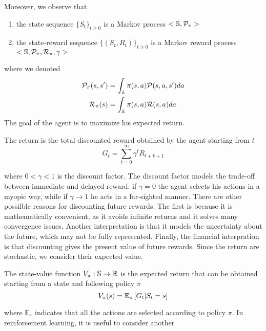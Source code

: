 Moreover, we observe that
\begin{enumerate}[label={\roman*)}]
	\item the state sequence ${\{S_t\}}_{t\geq 0}$ is a Markov process $<\S,
		  \calP_\pi>$
	  \item the state-reward sequence ${\{(S_t, R_t)\}}_{t\geq 0}$ is a Markov 
		  reward process $<\S, \calP_\pi, \calR_\pi, \gamma>$
\end{enumerate}
where we denoted 
\begin{equation}
	\begin{split}
		\calP_\pi(s, s') &= \int_\A \pi(s, a) \calP(s, a, s') da\\
		\calR_\pi(s) &= \int_\A \pi(s, a) \calR(s, a) da\\
	\end{split}
\end{equation}
The goal of the agent is to maximize his expected return. 
\begin{definition}[Return]
	The return is the total discounted reward obtained by the agent starting 
	from $t$  
	\begin{equation}
		G_t = \sum^{\infty}_{t=0} \gamma^t R_{t+k+1} 
	\end{equation}
\end{definition}
where $0 < \gamma < 1$ is the discount factor. The discount factor models the
trade-off between immediate and delayed reward: if $\gamma = 0$ the agent
selects his actions in a myopic way, while if $\gamma \to 1$ he acts in a
far-sighted manner. There are other possilble reasons for discounting future
rewards. The first is because it is mathematically convenient, as it avoids
infinite returns and it solves many convergence issues. Another interpretation
is that it models the uncertainty about the future, which may not be fully
represented. Finally, the financial interpration is that discounting gives the
present value of future rewards. Since the return are stochastic, we consider
their expected value. 
\begin{definition}
	The state-value function $V_\pi: \S \to \R$ is the expected return that can
	be obtained starting from a state and following policy $\pi$
	\begin{equation}
		V_\pi(s) = \E[\pi]{G_t|S_t = s}
	\end{equation}
\end{definition}
where $\mathbb{E}_{\pi}$ indicates that all the actions are selected according
to policy $\pi$. In reinforcement learning, it is useful to consider another
